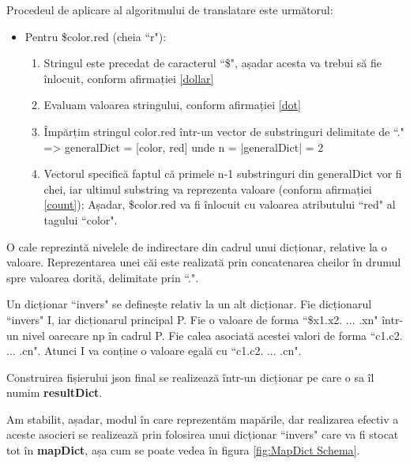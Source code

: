 Procedeul de aplicare al algoritmului de translatare este următorul:

\begin{itemize} \label{modalitate}
\item Pentru \$color.red (cheia ``r"): 
\begin{enumerate}
\item Stringul este precedat de caracterul ``\$", așadar acesta va trebui să fie înlocuit, conform afirmației \ref{dollar}
\item Evaluam valoarea stringului, conform afirmației \ref{dot}
\item Împărțim stringul color.red într-un vector de substringuri delimitate de ``." => generalDict = [color, red] unde n = |generalDict| = 2
\item Vectorul specifică faptul că primele n-1 substringuri din generalDict vor fi chei, iar ultimul substring va reprezenta valoare (conform afirmației \ref{count}); Așadar, \$color.red va fi înlocuit cu valoarea atributului ``red" al tagului ``color".
\end{enumerate}
\end{itemize}


\begin{mydef}\label{cale}
O cale reprezintă nivelele de indirectare din cadrul unui dicționar, relative la o valoare.
Reprezentarea unei căi este realizată prin concatenarea cheilor în drumul spre valoarea dorită, delimitate prin ``.".
\end{mydef}


\begin{mydef}

Un dicționar ``invers" se definește relativ la un alt dicționar. 
Fie dicționarul ``invers" I, iar dicționarul principal P. 
Fie o valoare de forma ``\$x1.x2. ... .xn" într-un nivel oarecare np în cadrul P. 
Fie calea asociată acestei valori de forma ``c1.c2. ... .cn".
Atunci I va conține o valoare egală cu ``c1.c2. ... .cn".
\end{mydef}

\begin{myNote}
Construirea fișierului json final se realizează într-un dicționar pe care o sa îl numim \textbf{resultDict}.
\end{myNote}

Am stabilit, așadar, modul în care reprezentăm mapările, dar realizarea efectiv a aceste asocieri se realizează prin folosirea unui dicționar ``invers" care va fi stocat tot în \textbf{mapDict}, așa cum se poate vedea în figura \ref{fig:MapDict Schema}.

